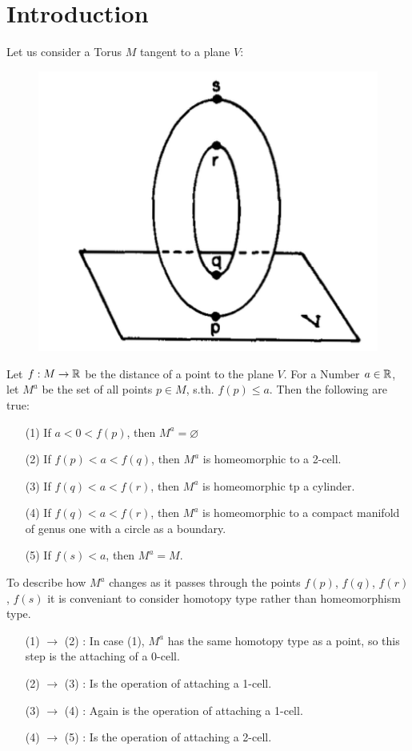 \section{Introduction}

Let us consider a Torus $M$ tangent to a plane $V$:
\begin{figure}[H]
    \centering
    \includegraphics[width=0.4\linewidth]{resources/Mil-Diagram1.png}
    \label{fig:mil-diagram1}
\end{figure}
Let $f: M \rightarrow {\mathbb R}$ be the distance of a point to the plane $V$. 
For a Number $a \in {\mathbb R} $, let $M^a$ be the set of all points $p \in M$, s.th. 
$f(p) \leq a$.
Then the following are true:
\begin{enumerate}
   \item[(1)] If $a < 0 < f(p)$, then $M^a = \varnothing$
   \item[(2)] If $f(p) < a < f(q)$, then $M^a$ is homeomorphic to a 2-cell.
   \item[(3)] If $f(q) < a < f(r)$, then $M^a$ is homeomorphic tp a cylinder.
   \item[(4)] If $f(q) < a < f(r)$, then $M^a$ is homeomorphic to a compact 
   manifold of genus one with a circle as a boundary.
   \item[(5)] If $f(s) < a$, then $M^a = M$.
\end{enumerate}

To describe how $M^a$ changes as it passes through the points $f(p)$, $f(q)$, 
$f(r)$, $f(s)$ it is conveniant to consider
homotopy type rather than homeomorphism type. 
\begin{enumerate}[leftmargin=2cm]
   \item[(1) $\rightarrow$ (2)]: In case (1), $M^a$ has the same homotopy type 
   as a point, so this step is the attaching of a 0-cell. 
   \item[(2) $\rightarrow$ (3)]: Is the operation of attaching a 1-cell. 
   \item[(3) $\rightarrow$ (4)]: Again is the operation of attaching a 1-cell. 
   \item[(4) $\rightarrow$ (5)]: Is the operation of attaching a 2-cell. 
\end{enumerate}

